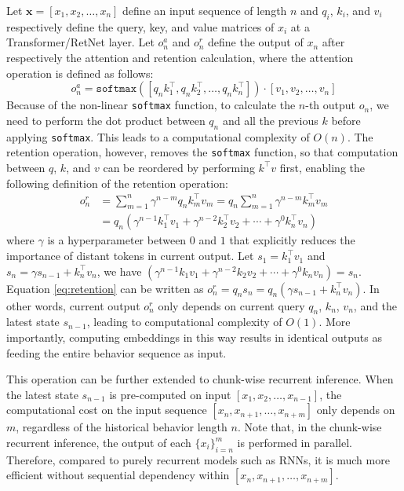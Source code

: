 \documentclass{article}
\begin{document}
Let $\bm{x} = [x_1, x_2, \ldots, x_n]$ define an input sequence of length $n$ and $q_i$, $k_i$, and $v_i$ respectively define the query, key, and value matrices of $x_i$ at a Transformer/RetNet layer. Let $o_n^a$ and $o_n^r$ define the output of $x_n$ after respectively the attention and retention calculation, where the attention operation is defined as follows:
\begin{equation}
    o_n^a = \texttt{softmax} ([q_nk_1^\top, q_nk_2^\top, \ldots, q_nk_n^\top]) \cdot [v_1, v_2, \ldots, v_n]
\end{equation}
Because of the non-linear \texttt{softmax} function, to calculate the $n$-th output $o_n$, we need to perform the dot product between $q_n$ and all the previous $k$ before applying \texttt{softmax}. This leads to a computational complexity of $O(n)$. The retention operation, however, removes the \texttt{softmax} function, so that computation between $q$, $k$, and $v$ can be reordered by performing $k^\top v$ first, enabling the following definition of the retention operation:
\begin{equation}
\label{eq:retention}
\begin{split}
o_n^r & = \sum_{m=1}^n \gamma^{n-m} q_nk^\top_mv_m  = q_n \sum_{m=1}^n \gamma^{n-m} k^\top_mv_m \\ & = q_n(\gamma^{n-1} k_1^\top v_1 + \gamma^{n-2} k_2^\top v_2 + \cdots +\gamma^{0} k_n^\top v_n)
\end{split}
\end{equation}
where $\gamma$ is a hyperparameter between $0$ and $1$ that explicitly reduces the importance of distant tokens in current output. Let $s_1 = k_1^\top v_1$ and $s_n = \gamma s_{n-1} + k_n^\top v_n$, we have $(\gamma^{n-1} k_1v_1 + \gamma^{n-2} k_2v_2 + \cdots +\gamma^{0} k_nv_n) = s_n$. Equation \ref{eq:retention} can be written as $o_n^r = q_ns_n = q_n(\gamma s_{n-1} + k_n^\top v_n)$. In other words, current output $o_n^r$ only depends on current query $q_n$, $k_n$, $v_n$, and the latest state $s_{n-1}$, leading to computational complexity of $O(1)$. More importantly, computing embeddings in this way results in identical outputs as feeding the entire behavior sequence as input. 

This operation can be further extended to chunk-wise recurrent inference. When the latest state $s_{n-1}$ is pre-computed on input $[x_1, x_2, \ldots, x_{n-1}]$, the computational cost on the input sequence $[x_n, x_{n+1}, \ldots, x_{n+m}]$ only depends on $m$, regardless of the historical behavior length $n$. Note that, in the chunk-wise recurrent inference, the output of each $\{x_i\}_{i=n}^m$ is performed in parallel. Therefore, compared to purely recurrent models such as RNNs, it is much more efficient without sequential dependency within $[x_n, x_{n+1}, \ldots, x_{n+m}]$.
\end{document}
